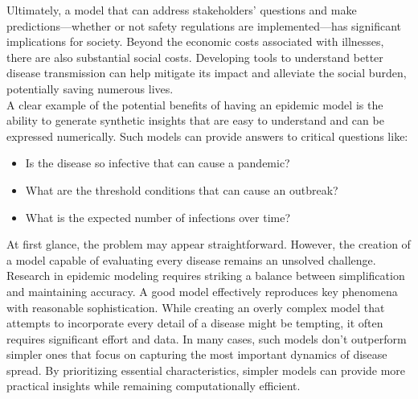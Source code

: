 Ultimately, a model that can address stakeholders' questions and make predictions—whether or not safety regulations are implemented—has significant implications for society. Beyond the economic costs associated with illnesses, there are also substantial social costs. Developing tools to understand better disease transmission can help mitigate its impact and alleviate the social burden, potentially saving numerous lives.
\\ \newline
A clear example of the potential benefits of having an epidemic model is the ability to generate synthetic insights that are easy to understand and can be expressed numerically. Such models can provide answers to critical questions like:
\begin{itemize}
	\item Is the disease so infective that can cause a pandemic?
	\item What are the threshold conditions that can cause an outbreak? 
	\item What is the expected number of infections over time?
\end{itemize}

At first glance, the problem may appear straightforward. However, the creation of a model capable of evaluating every disease remains an unsolved challenge.
Research in epidemic modeling requires striking a balance between simplification and maintaining accuracy. A good model effectively reproduces key phenomena with reasonable sophistication. While creating an overly complex model that attempts to incorporate every detail of a disease might be tempting, it often requires significant effort and data. In many cases, such models don't outperform simpler ones that focus on capturing the most important dynamics of disease spread. By prioritizing essential characteristics, simpler models can provide more practical insights while remaining computationally efficient.

